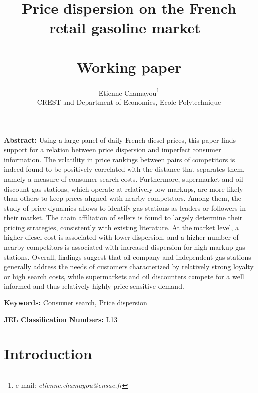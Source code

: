 \documentclass[english]{article}
\begin{document}
\title{Price dispersion on the French retail gasoline market\ \\ \ \\Working paper}
\author{Etienne Chamayou\thanks{e-mail:
\textit{etienne.chamayou@ensae.fr}}\medskip\\{\normalsize CREST and Department of Economics, Ecole Polytechnique }}
\maketitle

\sloppy%

\onehalfspacing

\textbf{Abstract:}
Using a large panel of daily French diesel prices, this paper finds support for a relation between price dispersion and imperfect consumer information. The volatility in price rankings between pairs of competitors is indeed found to be positively correlated with the distance that separates them, namely a measure of consumer search costs. Furthermore, supermarket and oil discount gas stations, which operate at relatively low markups, are more likely than others to keep prices aligned with nearby competitors. Among them, the study of price dynamics allows to identify gas stations as leaders or followers in their market. The chain affiliation of sellers is found to largely determine their pricing strategies, consistently with existing literature. At the market level, a higher diesel cost is associated with lower dispersion, and a higher number of nearby competitors is associated with increased dispersion for high markup gas stations. Overall, findings suggest that oil company and independent gas stations generally address the needs of customers characterized by relatively strong loyalty or high search costs, while supermarkets and oil discounters compete for a well informed and thus relatively highly price sensitive demand.

\strut

\textbf{Keywords:} Consumer search, Price dispersion

\strut

\textbf{JEL Classification Numbers:} L13

\pagebreak%

\section{Introduction}
\end{document}
